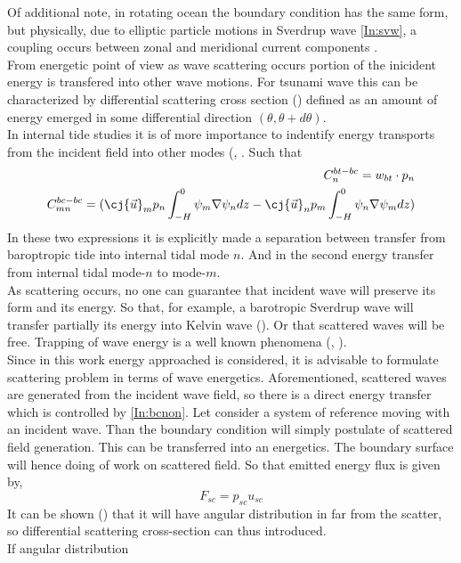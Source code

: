 Of additional note, in rotating ocean the boundary condition has the same form, but physically, due to elliptic particle motions in Sverdrup wave \eqref{In:svw}, a coupling occurs between zonal and meridional current components \cite{greenspan1968theory}.\\
From energetic point of view as wave scattering occurs portion of the inicident energy is transfered into other wave motions. For tsunami wave this can be characterized by differential scattering cross section (\cite{landau1988hydrodynamics}) defined as an amount of energy emerged in some differential direction $(\theta, \theta + d \theta)$.\\
In internal tide studies it is of more importance to indentify energy transports from the incident field into other modes (\cite{kurapov2003m}, \cite{kelly2012cascade}. Such that
\begin{align}
C_{n}^{bt-bc} = w_{bt} \cdot p_n\\
C_{mn}^{bc-bc} = (\cj{\vec{u}}_m p_n \int_{-H}^0 \psi_m \nabla \psi_n dz - \cj{\vec{u}}_n p_m \int_{-H}^0 \psi_n \nabla \psi_m dz)
\end{align}
In these two expressions it is explicitly made a separation between transfer from baroptropic tide into internal tidal mode $n$. And in the second energy transfer from internal tidal mode-$n$ to mode-$m$.\\
As scattering occurs, no one can guarantee that incident wave will preserve its form and its energy. So that, for example, a barotropic Sverdrup wave will transfer partially its energy into Kelvin wave (\cite{pinsent1972kelvin}). Or that scattered waves will be free. Trapping of wave energy is a well known phenomena (\cite{longuet1967trapping}, \cite{kowalik2002tidal}).\\
Since in this work energy approached is considered, it is advisable to formulate scattering problem in terms of wave energetics. Aforementioned, scattered waves are generated from the incident wave field, so there is a direct energy transfer which is controlled by \eqref{In:bcnon}. Let consider a system of reference moving with an incident wave. Than the boundary condition will simply postulate of scattered field generation. This can be transferred into an energetics. The boundary surface will hence doing of work on scattered field. So that emitted energy flux is given by,
\begin{equation}
F_{sc} = p_{sc} u_{sc}
\end{equation}
It can be shown (\cite{morse1958theoretical})	that it will have angular distribution in far from the scatter, so differential scattering cross-section can thus introduced.\\
If angular distribution 
 \\

